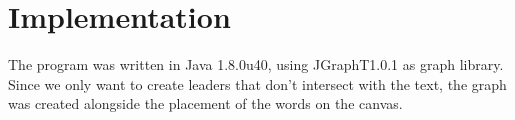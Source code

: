 \documentclass[11pt,a4paper]{vutinfth}
\begin{document}
\section{Implementation}
The program was written in Java 1.8.0u40, using JGraphT1.0.1\cite{JGraphT} as graph library. Since we only want to create leaders that don't intersect with the text, the graph was created alongside the placement of the words on the canvas.%











\backmatter %



\end{document}
